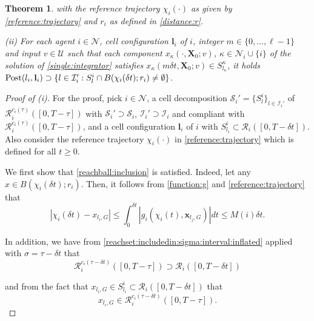 \documentclass[reqno]{amsart}
\theoremstyle{plain}
\newtheorem{thm}{Theorem}[section]
\theoremstyle{definition}
\numberwithin{equation}{section}
\begin{document}
\begin{thm}
\noindent with the reference trajectory $\chi_i(\cdot)$ as given by \eqref{reference:trajectory} and $r_i$ as defined in \eqref{distance:r}.

\noindent \textit{(ii)}  For each agent $i\in{\ensuremath{\mathcal{N}}}$, cell configuration ${\textbf{{l}}}_i$ of $i$, integer $m\in\{0,\ldots,\ell-1\}$ and input $v\in{\ensuremath{\mathcal{U}}}$ such that each component $x_{\kappa}(\cdot,{\textbf{{X}}}_0;v)$, $\kappa\in{\ensuremath{\mathcal{N}}}_i\cup\{i\}$ of the solution of \eqref{single:integrator} satisfies  $x_{\kappa}(m\delta t,{\textbf{{X}}}_0;v)\in S_{l_{\kappa}} ^{\kappa}$, it holds ${\rm Post}(l_i,{\textbf{{l}}}_i)\supset \{l\in{\ensuremath{\mathcal{I}}}_i':S_l^i\cap B(\chi_i(\delta t);r_i)\ne\emptyset\}$.
\end{thm}

\begin{proof}[Proof of (i)]
For the proof, pick $i\in{\ensuremath{\mathcal{N}}}$, a cell decomposition  ${\ensuremath{\mathcal{S}}}_i'=\{S_{l}^i\}_{l\in{\ensuremath{\mathcal{I}}}_i'}$ of ${\ensuremath{\mathcal{R}}}_i^{c_i(\tau)}([0,T-\tau])$ with ${\ensuremath{\mathcal{S}}}_i'\supset{\ensuremath{\mathcal{S}}}_i$, ${\ensuremath{\mathcal{I}}}_i'\supset{\ensuremath{\mathcal{I}}}_i$ and compliant with ${\ensuremath{\mathcal{R}}}_i^{c_i(\tau)}([0,T-\tau])$, and a cell configuration ${\textbf{{l}}}_i$ of $i$ with $S_{l_i}^i\subset{\ensuremath{\mathcal{R}}}_i([0,T-\delta t])$. Also consider the reference trajectory $\chi_i(\cdot)$ in \eqref{reference:trajectory} which is defined for all $t\ge 0$.

We first show that \eqref{reachball:inclusion} is satisfied. Indeed, let any $x\in B(\chi_i(\delta t);r_i)$. Then, it follows from \eqref{function:g} and \eqref{reference:trajectory} that 
\begin{equation} \label{reference:tr:bound}
|\chi_i(\delta t)-x_{l_i,G}|\le\int_0^{\delta t}|g_i(\chi_i(t),{\textbf{{x}}}_{l_j,G})|dt\le M(i)\delta t.
\end{equation}

\noindent In addition, we have from \eqref{reachset:includedin:sigma:interval:inflated} applied with $\sigma=\tau-\delta t$ that 
\begin{equation} \label{inflation:of:tau:min:deltat}
{\ensuremath{\mathcal{R}}}_i^{c_i(\tau-\delta t)}([0,T-\tau])\supset {\ensuremath{\mathcal{R}}}_i([0,T-\delta t])
\end{equation}

\noindent and from the fact that $x_{l_i,G}\in S_{l_i}^i\subset {\ensuremath{\mathcal{R}}}_i([0,T-\delta t])$ that 
\begin{equation} \label{xig:in:inflation}
x_{l_i,G}\in {\ensuremath{\mathcal{R}}}_i^{c_i(\tau-\delta t)}([0,T-\tau]).
\end{equation}


\end{proof}
\end{document}
